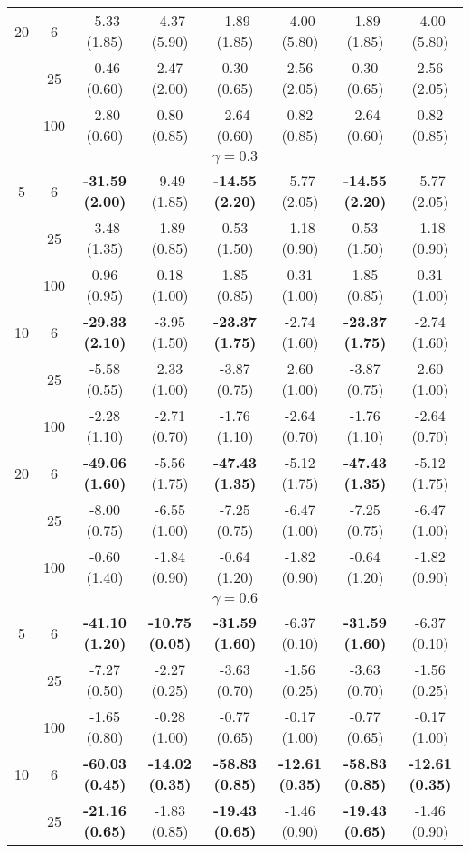 \documentclass[
  man]{apa6}
\newenvironment{lltable}{\begin{landscape}\centering\begin{ThreePartTable}}{\end{ThreePartTable}\end{landscape}}
\begin{document}
\begin{lltable}
{\begin{longtable}{cccccccc}
20 & 6 & -5.33 (1.85) & -4.37 (5.90) & -1.89 (1.85) & -4.00 (5.80) & -1.89 (1.85) & -4.00 (5.80)\\
 & 25 & -0.46 (0.60) & 2.47 (2.00) & 0.30 (0.65) & 2.56 (2.05) & 0.30 (0.65) & 2.56 (2.05)\\
 & 100 & -2.80 (0.60) & 0.80 (0.85) & -2.64 (0.60) & 0.82 (0.85) & -2.64 (0.60) & 0.82 (0.85)\\
\multicolumn{8}{c}{$\gamma = 0.3$}\\
5 & 6 & \textbf{-31.59 (2.00)} & -9.49 (1.85) & \textbf{-14.55 (2.20)} & -5.77 (2.05) & \textbf{-14.55 (2.20)} & -5.77 (2.05)\\
 & 25 & -3.48 (1.35) & -1.89 (0.85) & 0.53 (1.50) & -1.18 (0.90) & 0.53 (1.50) & -1.18 (0.90)\\
 & 100 & 0.96 (0.95) & 0.18 (1.00) & 1.85 (0.85) & 0.31 (1.00) & 1.85 (0.85) & 0.31 (1.00)\\
10 & 6 & \textbf{-29.33 (2.10)} & -3.95 (1.50) & \textbf{-23.37 (1.75)} & -2.74 (1.60) & \textbf{-23.37 (1.75)} & -2.74 (1.60)\\
 & 25 & -5.58 (0.55) & 2.33 (1.00) & -3.87 (0.75) & 2.60 (1.00) & -3.87 (0.75) & 2.60 (1.00)\\
 & 100 & -2.28 (1.10) & -2.71 (0.70) & -1.76 (1.10) & -2.64 (0.70) & -1.76 (1.10) & -2.64 (0.70)\\
20 & 6 & \textbf{-49.06 (1.60)} & -5.56 (1.75) & \textbf{-47.43 (1.35)} & -5.12 (1.75) & \textbf{-47.43 (1.35)} & -5.12 (1.75)\\
 & 25 & -8.00 (0.75) & -6.55 (1.00) & -7.25 (0.75) & -6.47 (1.00) & -7.25 (0.75) & -6.47 (1.00)\\
 & 100 & -0.60 (1.40) & -1.84 (0.90) & -0.64 (1.20) & -1.82 (0.90) & -0.64 (1.20) & -1.82 (0.90)\\
\multicolumn{8}{c}{$\gamma = 0.6$}\\
5 & 6 & \textbf{-41.10 (1.20)} & \textbf{-10.75 (0.05)} & \textbf{-31.59 (1.60)} & -6.37 (0.10) & \textbf{-31.59 (1.60)} & -6.37 (0.10)\\
 & 25 & -7.27 (0.50) & -2.27 (0.25) & -3.63 (0.70) & -1.56 (0.25) & -3.63 (0.70) & -1.56 (0.25)\\
 & 100 & -1.65 (0.80) & -0.28 (1.00) & -0.77 (0.65) & -0.17 (1.00) & -0.77 (0.65) & -0.17 (1.00)\\
10 & 6 & \textbf{-60.03 (0.45)} & \textbf{-14.02 (0.35)} & \textbf{-58.83 (0.85)} & \textbf{-12.61 (0.35)} & \textbf{-58.83 (0.85)} & \textbf{-12.61 (0.35)}\\
 & 25 & \textbf{-21.16 (0.65)} & -1.83 (0.85) & \textbf{-19.43 (0.65)} & -1.46 (0.90) & \textbf{-19.43 (0.65)} & -1.46 (0.90)\\

\end{longtable}}
\end{lltable}
\end{document}
